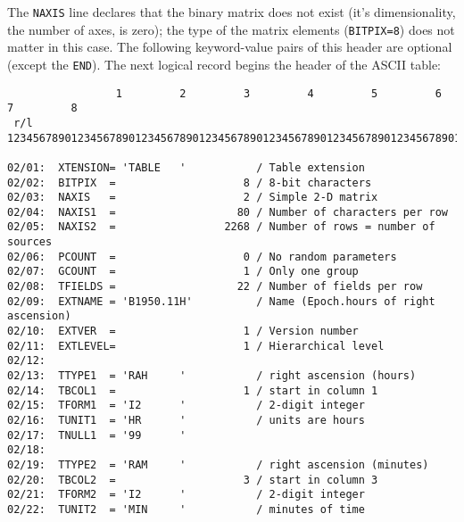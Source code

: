 The {\tt NAXIS} line declares that the binary matrix does not exist
(it's dimensionality, the number of axes, is zero); the type of the
matrix elements ({\tt BITPIX=8}) does not matter in this case. The
following keyword-value pairs of this header are optional (except the
{\tt END}). The next logical record begins the header of the ASCII
table:

{\footnotesize \begin{verbatim}
                 1         2         3         4         5         6         7         8
 r/l    12345678901234567890123456789012345678901234567890123456789012345678901234567890

02/01:  XTENSION= 'TABLE   '           / Table extension                                
02/02:  BITPIX  =                    8 / 8-bit characters                               
02/03:  NAXIS   =                    2 / Simple 2-D matrix                              
02/04:  NAXIS1  =                   80 / Number of characters per row                   
02/05:  NAXIS2  =                 2268 / Number of rows = number of sources             
02/06:  PCOUNT  =                    0 / No random parameters                           
02/07:  GCOUNT  =                    1 / Only one group                                 
02/08:  TFIELDS =                   22 / Number of fields per row                       
02/09:  EXTNAME = 'B1950.11H'          / Name (Epoch.hours of right ascension)          
02/10:  EXTVER  =                    1 / Version number                                 
02/11:  EXTLEVEL=                    1 / Hierarchical level                             
02/12:                                                                                  
02/13:  TTYPE1  = 'RAH     '           / right ascension (hours)                        
02/14:  TBCOL1  =                    1 / start in column 1                              
02/15:  TFORM1  = 'I2      '           / 2-digit integer                                
02/16:  TUNIT1  = 'HR      '           / units are hours                                
02/17:  TNULL1  = '99      '                                                            
02/18:                                                                                  
02/19:  TTYPE2  = 'RAM     '           / right ascension (minutes)                      
02/20:  TBCOL2  =                    3 / start in column 3                              
02/21:  TFORM2  = 'I2      '           / 2-digit integer                                
02/22:  TUNIT2  = 'MIN     '           / minutes of time                                

\end{verbatim}}
